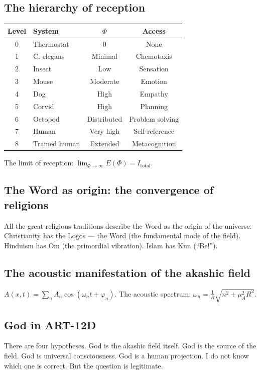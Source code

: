 \subsection{The hierarchy of reception}
\begin{table}[H]
\centering
\begin{tabular}{@{}clcc@{}}
\toprule
\textbf{Level} & \textbf{System} & \textbf{$\Phi$} & \textbf{Access} \\ \midrule
0 & Thermostat & 0 & None \\
1 & C. elegans & Minimal & Chemotaxis \\
2 & Insect & Low & Sensation \\
3 & Mouse & Moderate & Emotion \\
4 & Dog & High & Empathy \\
5 & Corvid & High & Planning \\
6 & Octopod & Distributed & Problem solving \\
7 & Human & Very high & Self-reference \\
8 & Trained human & Extended & Metacognition \\ \bottomrule
\end{tabular}
\end{table}
The limit of reception: $\lim_{\Phi \rightarrow \infty} E(\Phi) = I_{\text{total}}$.

\subsection{The Word as origin: the convergence of religions}
All the great religious traditions describe the Word as the origin of the universe. Christianity has the Logos --- the Word (the fundamental mode of the field). Hinduism has Om (the primordial vibration). Islam has Kun (``Be!'').

\subsection{The acoustic manifestation of the akashic field}
$A(x,t) = \sum_n A_n \cos(\omega_n t + \varphi_n)$. The acoustic spectrum: $\omega_n = \frac{1}{R} \sqrt{n^2 + \mu_A^2 R^2}$.

\subsection{God in ART-12D}
There are four hypotheses. God is the akashic field itself. God is the source of the field. God is universal consciousness. God is a human projection. I do not know which one is correct. But the question is legitimate.

